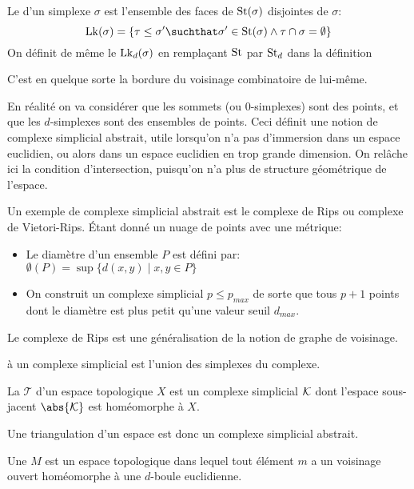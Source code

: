 \begin{definition}
	Le  d'un simplexe $\sigma$ est l'ensemble des faces de $\operatorname{St}(\sigma)$ disjointes de $\sigma$:
	\begin{equation*}
		\Lk(\sigma) = \left\{\tau \leq \sigma' \suchthat \sigma' \in \St(\sigma) \land \tau \cap \sigma = \emptyset \right\}
	\end{equation*}
	On définit de même le  $\operatorname{Lk}_{d}(\sigma)$ en remplaçant $\operatorname{St}$ par $\operatorname{St}_{d}$ dans la définition
\end{definition}
C'est en quelque sorte la bordure du voisinage combinatoire de lui-même.

\medskip

En réalité on va considérer que les sommets (ou $0$-simplexes) sont des points, et que les $d$-simplexes sont des ensembles de points.
Ceci définit une notion de complexe simplicial abstrait, utile lorsqu'on n'a pas d'immersion dans un espace euclidien, ou alors dans un espace euclidien en trop grande dimension.
On relâche ici la condition d'intersection, puisqu'on n'a plus de structure géométrique de l'espace.

Un exemple de complexe simplicial abstrait est le complexe de Rips ou complexe de Vietori-Rips. Étant donné un nuage de points avec une métrique:
\begin{itemize}
	\item Le diamètre d'un ensemble $P$ est défini par: $\emptyset(P) = \sup\{d(x, y) \mid x, y \in P\}$
	\item On construit un complexe simplicial $p \leq p_{max}$ de sorte que tous $p + 1$ points dont le diamètre est plus petit qu'une valeur seuil $d_{max}$.
\end{itemize}
Le complexe de Rips est une généralisation de la notion de graphe de voisinage.

\begin{definition}
	 à un complexe simplicial est l'union des simplexes du complexe.
\end{definition}

\begin{definition}
	La  $\mathcal{T}$ d'un espace topologique $X$ est un complexe simplicial $\mathcal{K}$ dont l'espace sous-jacent $\abs{\mK}$ est homéomorphe à $X$.
\end{definition}
Une triangulation d'un espace est donc un complexe simplicial abstrait.


\begin{definition}
	Une  $M$ est un espace topologique dans lequel tout élément $m$ a un voisinage ouvert homéomorphe à une $d$-boule euclidienne.
\end{definition}

